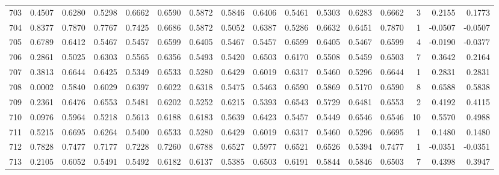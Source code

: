 \begin{tabular}{lrrrrrrrrrrrrrrr}
703 &      0.4507 &  0.6280 &  0.5298 &  0.6662 &  0.6590 &  0.5872 &  0.5846 &  0.6406 &  0.5461 &  0.5303 &   0.6283 &     0.6662 &      3 &                    0.2155 &                     0.1773 \\
704 &      0.8377 &  0.7870 &  0.7767 &  0.7425 &  0.6686 &  0.5872 &  0.5052 &  0.6387 &  0.5286 &  0.6632 &   0.6451 &     0.7870 &      1 &                   -0.0507 &                    -0.0507 \\
705 &      0.6789 &  0.6412 &  0.5467 &  0.5457 &  0.6599 &  0.6405 &  0.5467 &  0.5457 &  0.6599 &  0.6405 &   0.5467 &     0.6599 &      4 &                   -0.0190 &                    -0.0377 \\
706 &      0.2861 &  0.5025 &  0.6303 &  0.5565 &  0.6356 &  0.5493 &  0.5420 &  0.6503 &  0.6170 &  0.5508 &   0.5459 &     0.6503 &      7 &                    0.3642 &                     0.2164 \\
707 &      0.3813 &  0.6644 &  0.6425 &  0.5349 &  0.6533 &  0.5280 &  0.6429 &  0.6019 &  0.6317 &  0.5460 &   0.5296 &     0.6644 &      1 &                    0.2831 &                     0.2831 \\
708 &      0.0002 &  0.5840 &  0.6029 &  0.6397 &  0.6022 &  0.6318 &  0.5475 &  0.5463 &  0.6590 &  0.5869 &   0.5170 &     0.6590 &      8 &                    0.6588 &                     0.5838 \\
709 &      0.2361 &  0.6476 &  0.6553 &  0.5481 &  0.6202 &  0.5252 &  0.6215 &  0.5393 &  0.6543 &  0.5729 &   0.6481 &     0.6553 &      2 &                    0.4192 &                     0.4115 \\
710 &      0.0976 &  0.5964 &  0.5218 &  0.5613 &  0.6188 &  0.6183 &  0.5639 &  0.6423 &  0.5457 &  0.5449 &   0.6546 &     0.6546 &     10 &                    0.5570 &                     0.4988 \\
711 &      0.5215 &  0.6695 &  0.6264 &  0.5400 &  0.6533 &  0.5280 &  0.6429 &  0.6019 &  0.6317 &  0.5460 &   0.5296 &     0.6695 &      1 &                    0.1480 &                     0.1480 \\
712 &      0.7828 &  0.7477 &  0.7177 &  0.7228 &  0.7260 &  0.6788 &  0.6527 &  0.5977 &  0.6521 &  0.6526 &   0.5394 &     0.7477 &      1 &                   -0.0351 &                    -0.0351 \\
713 &      0.2105 &  0.6052 &  0.5491 &  0.5492 &  0.6182 &  0.6137 &  0.5385 &  0.6503 &  0.6191 &  0.5844 &   0.5846 &     0.6503 &      7 &                    0.4398 &                     0.3947 \\

\end{tabular}
